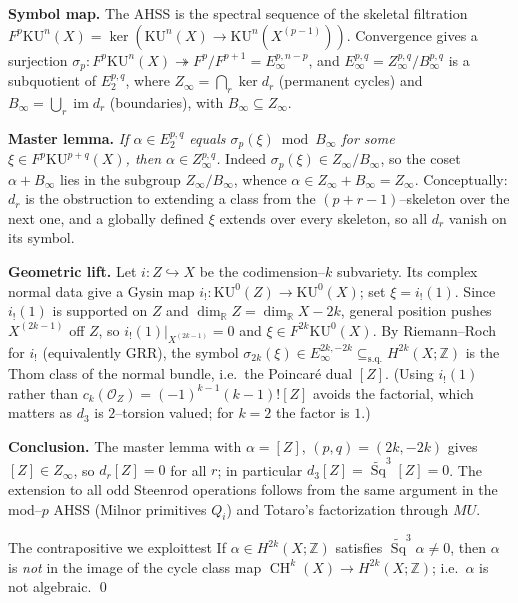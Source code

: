 \documentclass{article}
\newcommand{\Z}{{\mathbb{Z}}}
\DeclareMathOperator{\Sq}{Sq}
\DeclareMathOperator{\CH}{CH}
\newcommand{\KU}{\mathrm{KU}}
\begin{document}
\begin{Proof}
\textbf{Symbol map.} The AHSS is the spectral sequence of the skeletal
filtration $F^p\KU^n(X)=\ker(\KU^n(X)\to\KU^n(X^{(p-1)}))$. Convergence gives a
surjection $\sigma_p\colon F^p\KU^n(X)\twoheadrightarrow F^p/F^{p+1}
=E_\infty^{p,n-p}$, and $E_\infty^{p,q}=Z_\infty^{p,q}/B_\infty^{p,q}$ is a
subquotient of $E_2^{p,q}$, where $Z_\infty=\bigcap_r\ker d_r$ (permanent cycles)
and $B_\infty=\bigcup_r\operatorname{im}d_r$ (boundaries), with
$B_\infty\subseteq Z_\infty$.

\smallskip
\textbf{Master lemma.} \emph{If $\alpha\in E_2^{p,q}$ equals $\sigma_p(\xi)\bmod
B_\infty$ for some $\xi\in F^p\KU^{p+q}(X)$, then $\alpha\in Z_\infty^{p,q}$.}
Indeed $\sigma_p(\xi)\in Z_\infty/B_\infty$, so the coset $\alpha+B_\infty$ lies
in the subgroup $Z_\infty/B_\infty$, whence $\alpha\in Z_\infty+B_\infty=Z_\infty$.
Conceptually: $d_r$ is the obstruction to extending a class from the
$(p{+}r{-}1)$--skeleton over the next one, and a globally defined $\xi$ extends
over every skeleton, so all $d_r$ vanish on its symbol.

\smallskip
\textbf{Geometric lift.} Let $i\colon Z\hookrightarrow X$ be the codimension--$k$
subvariety. Its complex normal data give a Gysin map
$i_!\colon\KU^0(Z)\to\KU^0(X)$; set $\xi=i_!(1)$. Since $i_!(1)$ is supported on
$Z$ and $\dim_{\mathbb R}Z=\dim_{\mathbb R}X-2k$, general position pushes
$X^{(2k-1)}$ off $Z$, so $i_!(1)|_{X^{(2k-1)}}=0$ and $\xi\in F^{2k}\KU^0(X)$.
By Riemann--Roch for $i_!$ (equivalently GRR), the symbol
$\sigma_{2k}(\xi)\in E_\infty^{2k,-2k}\subseteq_{\mathrm{s.q.}}H^{2k}(X;\Z)$ is the
Thom class of the normal bundle, i.e.\ the Poincar\'e dual $[Z]$. (Using $i_!(1)$
rather than $c_k(\mathcal O_Z)=(-1)^{k-1}(k-1)![Z]$ avoids the factorial, which
matters as $d_3$ is $2$--torsion valued; for $k=2$ the factor is $1$.)

\smallskip
\textbf{Conclusion.} The master lemma with $\alpha=[Z]$, $(p,q)=(2k,-2k)$ gives
$[Z]\in Z_\infty$, so $d_r[Z]=0$ for all $r$; in particular
$d_3[Z]=\widetilde{\Sq}^3[Z]=0$. The extension to all odd Steenrod operations
follows from the same argument in the mod--$p$ AHSS (Milnor primitives $Q_i$) and
Totaro's factorization through $MU$.
\end{Proof}

\begin{cor}{The contrapositive we exploit}{test}
If $\alpha\in H^{2k}(X;\Z)$ satisfies $\widetilde{\Sq}^3\alpha\neq 0$, then
$\alpha$ is \emph{not} in the image of the cycle class map
$\CH^k(X)\to H^{2k}(X;\Z)$; i.e.\ $\alpha$ is not algebraic. \qed
\end{cor}
\end{document}

